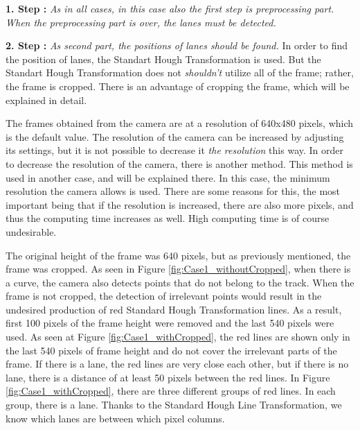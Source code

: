 \textbf{1. Step : }\emph{\color{blue}As in all cases, in this case also the first step is preprocessing part. When the preprocessing part is over, the lanes must be detected. }

\textbf{2. Step : }\emph{\color{blue} As second part, the positions of lanes should be found.} In order to find the position of lanes, the Standart Hough Transformation is used. But the Standart Hough Transformation does not \emph{\color{blue}shouldn't} utilize all of the frame; rather, the frame is cropped. There is an advantage of cropping the frame, which will be explained in detail.


The frames obtained from the camera are at a resolution of 640x480 pixels, which is the default value. The resolution of the camera can be increased by adjusting its settings, but it is not possible to decrease it \emph{\color{blue}the resolution} this way. In order to decrease the resolution of the camera, there is another method. This method is used in another case, and will be explained there. In this case, the minimum resolution the camera allows is used. There are some reasons for this, the most important being that if the resolution is increased, there are also more pixels, and thus the computing time increases as well. High computing time is of course undesirable.
 
The original height of the frame was 640 pixels, but as previously mentioned, the frame was cropped. As seen in Figure \ref{fig:Case1_withoutCropped}, when there is a curve, the camera also detects points that do not belong to the track. When the frame is not cropped, the detection of irrelevant points would result in the undesired production of red Standard Hough Transformation lines. As a result, first 100 pixels of the frame height were removed and the last 540 pixels were used. As seen at Figure \ref{fig:Case1_withCropped}, the red lines are shown only in the last 540 pixels of frame height and do not cover the irrelevant parts of the frame. If there is a lane, the red lines are very close each other, but if there is no lane, there is a distance of at least 50 pixels between the red lines. In Figure \ref{fig:Case1_withCropped}, there are three different groups of red lines. In each group, there is a lane. Thanks to the Standard Hough Line Transformation, we know which lanes are between which pixel columns.

